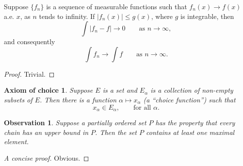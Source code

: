 \begin{theorem}
  Suppose $\{f_n\}$ is a sequence of measurable functions such that
  $f_n(x) \to f(x)$ a.e. $x$, as $n$ tends to infinity.
  If $|f_n(x)| \le g(x)$, where $g$ is integrable, then
  \begin{equation}
    \int |f_n - f| \to 0 \qquad \text{as } n \to \infty,
  \end{equation}
  and consequently
  \begin{equation}
    \int f_n \to \int f \qquad \text{as } n \to \infty.
  \end{equation}
\end{theorem}

\begin{proof}
  Trivial.
\end{proof}

\newtheorem*{axiomofchoice}{Axiom of choice}
\begin{axiomofchoice}
  Suppose $E$ is a set and ${E_\alpha}$ is a collection of
  non-empty subsets of $E$. Then there is a function $\alpha
  \mapsto x_\alpha$ (a ``choice function'') such that
  \begin{equation}
    x_\alpha \in E_\alpha,\qquad \text{for all }\alpha.
  \end{equation}
\end{axiomofchoice}

\newtheorem{observation}{Observation}
\begin{observation}
  Suppose a partially ordered set $P$ has the property
  that every chain has an upper bound in $P$. Then the
  set $P$ contains at least one maximal element.
\end{observation}
\begin{proof}[A concise proof]
  Obvious.
\end{proof}
